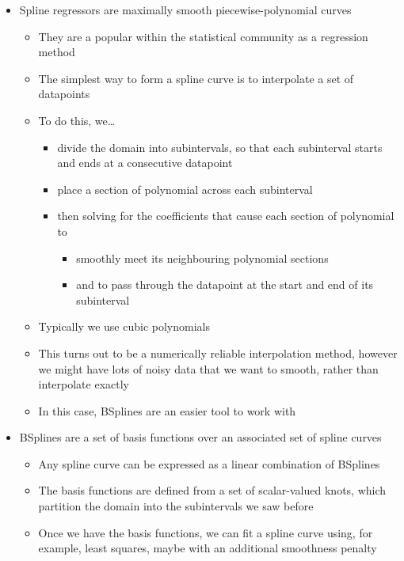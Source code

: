 \documentclass[11pt]{article}
\begin{document}
\begin{itemize}
\item Spline regressors are maximally smooth piecewise-polynomial curves
\begin{itemize}
\item They are a popular within the statistical community as a regression method
\item The simplest way to form a spline curve is to interpolate a set of datapoints
\item To do this, we\ldots{}
\begin{itemize}
\item divide the domain into subintervals, so that each subinterval starts and ends at a consecutive datapoint
\item place a section of polynomial across each subinterval
\item then solving for the coefficients that cause each section of polynomial to
\begin{itemize}
\item smoothly meet its neighbouring polynomial sections
\item and to pass through the datapoint at the start and end of its subinterval
\end{itemize}
\end{itemize}
\item Typically we use cubic polynomials
\item This turns out to be a numerically reliable interpolation method, however we might have lots of noisy data that we want to smooth, rather than interpolate exactly
\item In this case, BSplines are an easier tool to work with
\end{itemize}

\item BSplines are a set of basis functions over an associated set of spline curves
\begin{itemize}
\item Any spline curve can be expressed as a linear combination of BSplines
\item The basis functions are defined from a set of scalar-valued knots, which partition the domain into the subintervals we saw before
\item Once we have the basis functions, we can fit a spline curve using, for example, least squares, maybe with an additional smoothness penalty
\end{itemize}


\end{itemize}
\end{document}
